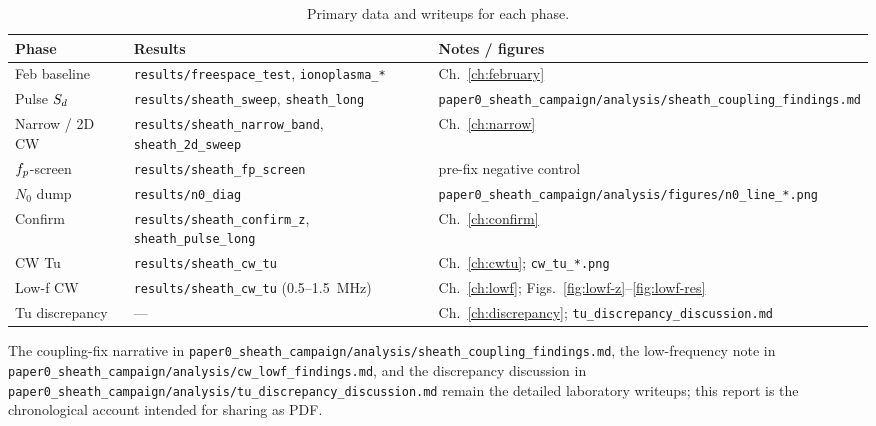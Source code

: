 \begin{table}[ht]
\centering
\caption{Primary data and writeups for each phase.}
\label{tab:datamap}
\begin{tabular}{@{}lll@{}}
\toprule
Phase & Results & Notes / figures \\
\midrule
Feb baseline & \texttt{results/freespace\_test}, \texttt{ionoplasma\_*} & Ch.~\ref{ch:february} \\
Pulse \(S_d\) & \texttt{results/sheath\_sweep}, \texttt{sheath\_long} & \texttt{paper0_sheath_campaign/analysis/sheath\_coupling\_findings.md} \\
Narrow / 2D CW & \texttt{results/sheath\_narrow\_band}, \texttt{sheath\_2d\_sweep} & Ch.~\ref{ch:narrow} \\
\(f_p\)-screen & \texttt{results/sheath\_fp\_screen} & pre-fix negative control \\
\(N_0\) dump & \texttt{results/n0\_diag} & \texttt{paper0_sheath_campaign/analysis/figures/n0\_line\_*.png} \\
Confirm & \texttt{results/sheath\_confirm\_z}, \texttt{sheath\_pulse\_long} & Ch.~\ref{ch:confirm} \\
CW Tu & \texttt{results/sheath\_cw\_tu} & Ch.~\ref{ch:cwtu}; \texttt{cw\_tu\_*.png} \\
Low-f CW & \texttt{results/sheath\_cw\_tu} (0.5--1.5~MHz) & Ch.~\ref{ch:lowf}; Figs.~\ref{fig:lowf-z}--\ref{fig:lowf-res} \\
Tu discrepancy & --- & Ch.~\ref{ch:discrepancy}; \texttt{tu\_discrepancy\_discussion.md} \\
\bottomrule
\end{tabular}
\end{table}

The coupling-fix narrative in \texttt{paper0_sheath_campaign/analysis/sheath\_coupling\_findings.md}, the low-frequency note in \texttt{paper0_sheath_campaign/analysis/cw\_lowf\_findings.md}, and the discrepancy discussion in \texttt{paper0_sheath_campaign/analysis/tu\_discrepancy\_discussion.md} remain the detailed laboratory writeups; this report is the chronological account intended for sharing as PDF.
